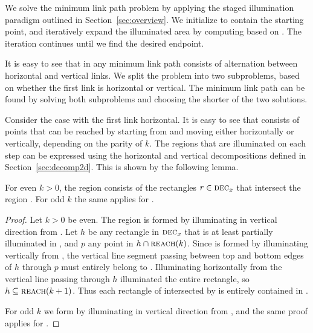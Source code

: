 \documentclass[english,gradu]{tktltiki2018}
\begin{document}
We solve the minimum link path problem by applying the staged illumination paradigm outlined in Section~\ref{sec:overview}.
We initialize  to contain the starting point, and iteratively expand the illuminated area by computing  based on .
The iteration continues until we find the desired endpoint.

It is easy to see that in any minimum link path consists of alternation between horizontal and vertical links.
We split the problem into two subproblems, based on whether the first link is horizontal or vertical.
The minimum link path can be found by solving both subproblems and choosing the shorter of the two solutions.

Consider the case with the first link horizontal.
It is easy to see that  consists of points that can be reached by starting from  and moving either horizontally or vertically, depending on the parity of $k$.
The regions that are illuminated on each step can be expressed using the horizontal and vertical decompositions defined in Section~\ref{sec:decomp2d}.
This is shown by the following lemma.

\begin{lem}\label{lem:illum2d}
For even $k>0$, the region  consists of the rectangles $r\in\textsc{dec}_{x}$ that intersect the region .
For odd $k$ the same applies for .
\end{lem}
\begin{proof}
Let $k>0$ be even.
The region  is formed by illuminating in vertical direction from .
Let $h$ be any rectangle in $\textsc{dec}_{x}$ that is at least partially illuminated in , and $p$ any point in $h\cap\textsc{reach}(k)$.
Since  is formed by illuminating vertically from , the vertical line segment passing between top and bottom edges of $h$ through $p$ must entirely belong to .
Illuminating horizontally from the vertical line passing through $h$ illuminated the entire rectangle, so $h\subseteq\textsc{reach}(k+1)$.
Thus each rectangle of  intersected by  is entirely contained in .

For odd $k$ we form  by illuminating in vertical direction from , and the same proof applies for .
\end{proof}
\end{document}
